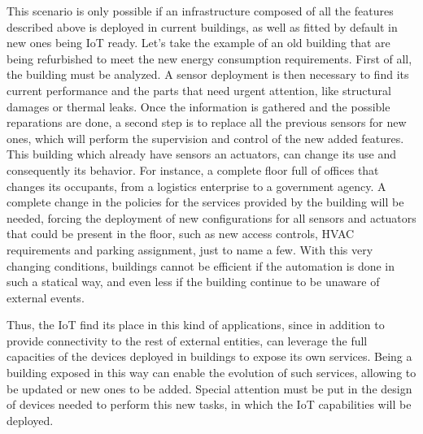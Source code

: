 This scenario is only possible if an infrastructure composed of all the features described above is deployed in current buildings, as well as fitted by default in new ones being IoT ready.
Let's take the example of an old building that are being refurbished to meet the new energy consumption requirements.
First of all, the building must be analyzed.
A sensor deployment is then necessary to find its current performance and the parts that need urgent attention, like structural damages or thermal leaks.
Once the information is gathered and the possible reparations are done, a second step is to replace all the previous sensors for new ones, which will perform the supervision and control of the new added features.
This building which already have sensors an actuators, can change its use and consequently its behavior.
For instance, a complete floor full of offices that changes its occupants, from a logistics enterprise to a government agency.
A complete change in the policies for the services provided by the building will be needed, forcing the deployment of new configurations for all sensors and actuators that could be present in the floor, such as new access controls, HVAC requirements and parking assignment, just to name a few.
With this very changing conditions, buildings cannot be efficient if the automation is done in such a statical way, and even less if the building continue to be unaware of external events.

Thus, the IoT find its place in this kind of applications, since in addition to provide connectivity to the rest of external entities, can leverage the full capacities of the devices deployed in buildings to expose its own services. Being a building exposed in this way can enable the evolution of such services, allowing to be updated or new ones to be added.
Special attention must be put in the design of devices needed to perform this new tasks, in which the IoT capabilities will be deployed.

